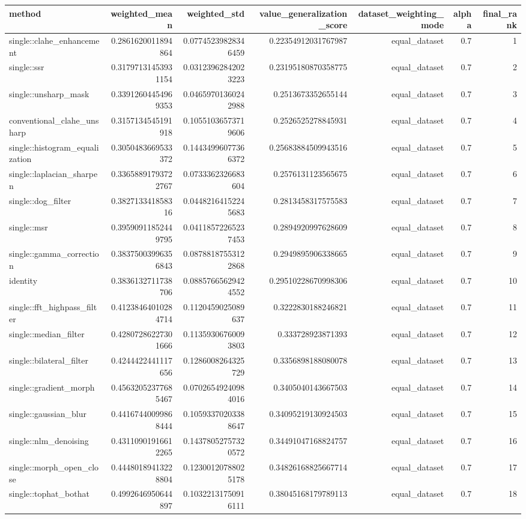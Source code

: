 \begin{tabular}{lrrrrrr}
\hline
method & weighted\_mean & weighted\_std & value\_generalization\_score & dataset\_weighting\_mode & alpha & final\_rank \\
\hline
single::clahe\_enhancement & 0.2861620011894864 & 0.07745239828346459 & 0.22354912031767987 & equal\_dataset & 0.7 & 1 \\
single::ssr & 0.31797131453931154 & 0.03123962842023223 & 0.23195180870358775 & equal\_dataset & 0.7 & 2 \\
single::unsharp\_mask & 0.33912604454969353 & 0.04659701360242988 & 0.2513673352655144 & equal\_dataset & 0.7 & 3 \\
conventional\_clahe\_unsharp & 0.3157134545191918 & 0.10551036573719606 & 0.2526525278845931 & equal\_dataset & 0.7 & 4 \\
single::histogram\_equalization & 0.3050483669533372 & 0.14434996077366372 & 0.25683884509943516 & equal\_dataset & 0.7 & 5 \\
single::laplacian\_sharpen & 0.33658891793722767 & 0.0733362326683604 & 0.2576131123565675 & equal\_dataset & 0.7 & 6 \\
single::dog\_filter & 0.382713341858316 & 0.04482164152245683 & 0.2813458317575583 & equal\_dataset & 0.7 & 7 \\
single::msr & 0.39590911852449795 & 0.04118572265237453 & 0.2894920997628609 & equal\_dataset & 0.7 & 8 \\
single::gamma\_correction & 0.38375003996356843 & 0.08788187553122868 & 0.2949895906338665 & equal\_dataset & 0.7 & 9 \\
identity & 0.3836132711738706 & 0.08857665629424552 & 0.29510228670998306 & equal\_dataset & 0.7 & 10 \\
single::fft\_highpass\_filter & 0.41238464010284714 & 0.1120459025089637 & 0.3222830188246821 & equal\_dataset & 0.7 & 11 \\
single::median\_filter & 0.42807286227301666 & 0.11359306760093803 & 0.333728923871393 & equal\_dataset & 0.7 & 12 \\
single::bilateral\_filter & 0.4244422441117656 & 0.1286008264325729 & 0.3356898188080078 & equal\_dataset & 0.7 & 13 \\
single::gradient\_morph & 0.45632052377685467 & 0.07026549240984016 & 0.3405040143667503 & equal\_dataset & 0.7 & 14 \\
single::gaussian\_blur & 0.44167440099868444 & 0.10593370203388647 & 0.34095219130924503 & equal\_dataset & 0.7 & 15 \\
single::nlm\_denoising & 0.43110901916612265 & 0.14378052757320572 & 0.34491047168824757 & equal\_dataset & 0.7 & 16 \\
single::morph\_open\_close & 0.44480189413228804 & 0.12300120788025178 & 0.34826168825667714 & equal\_dataset & 0.7 & 17 \\
single::tophat\_bothat & 0.4992646950644897 & 0.10322131750916111 & 0.38045168179789113 & equal\_dataset & 0.7 & 18 \\
\hline
\end{tabular}
